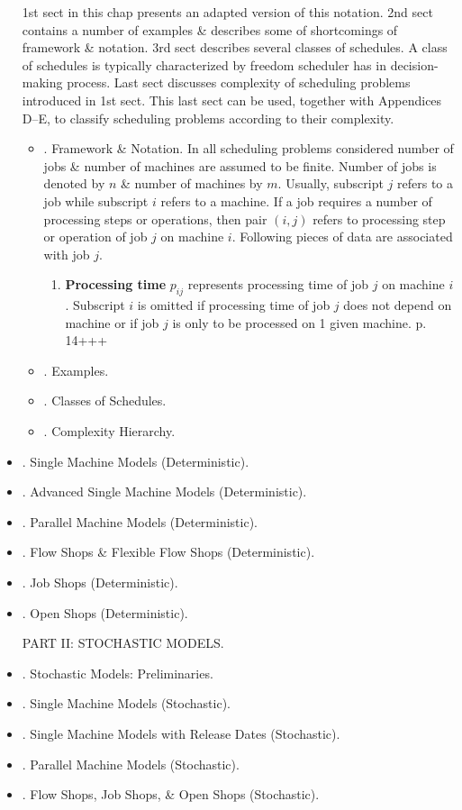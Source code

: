 \documentclass{article}
\begin{document}
\begin{itemize}
    1st sect in this chap presents an adapted version of this notation. 2nd sect contains a number of examples \& describes some of shortcomings of framework \& notation. 3rd sect describes several classes of schedules. A class of schedules is typically characterized by freedom scheduler has in decision-making process. Last sect discusses complexity of scheduling problems introduced in 1st sect. This last sect can be used, together with Appendices D--E, to classify scheduling problems according to their complexity.
    \begin{itemize}
        \item {. Framework \& Notation.} In all scheduling problems considered number of jobs \& number of machines are assumed to be finite. Number of jobs is denoted by $n$ \& number of machines by $m$. Usually, subscript $j$ refers to a job while subscript $i$ refers to a machine. If a job requires a number of processing steps or operations, then pair $(i,j)$ refers to processing step or operation of job $j$ on machine $i$. Following pieces of data are associated with job $j$.
        \begin{enumerate}
            \item {\bf Processing time} $p_{ij}$ represents processing time of job $j$ on machine $i$. Subscript $i$ is omitted if processing time of job $j$ does not depend on machine or if job $j$ is only to be processed on 1 given machine.
            p. 14+++
        \end{enumerate}
        \item {. Examples.}
        \item {. Classes of Schedules.}
        \item {. Complexity Hierarchy.}
    \end{itemize}
    \item {. Single Machine Models (Deterministic).}
    \item {. Advanced Single Machine Models (Deterministic).}
    \item {. Parallel Machine Models (Deterministic).}
    \item {. Flow Shops \& Flexible Flow Shops (Deterministic).}
    \item {. Job Shops (Deterministic).}
    \item {. Open Shops (Deterministic).}
    
    PART II: STOCHASTIC MODELS.
    \item {. Stochastic Models: Preliminaries.}
    \item {. Single Machine Models (Stochastic).}
    \item {. Single Machine Models with Release Dates (Stochastic).}
    \item {. Parallel Machine Models (Stochastic).}
    \item {. Flow Shops, Job Shops, \& Open Shops (Stochastic).}
    

\end{itemize}
\end{document}
